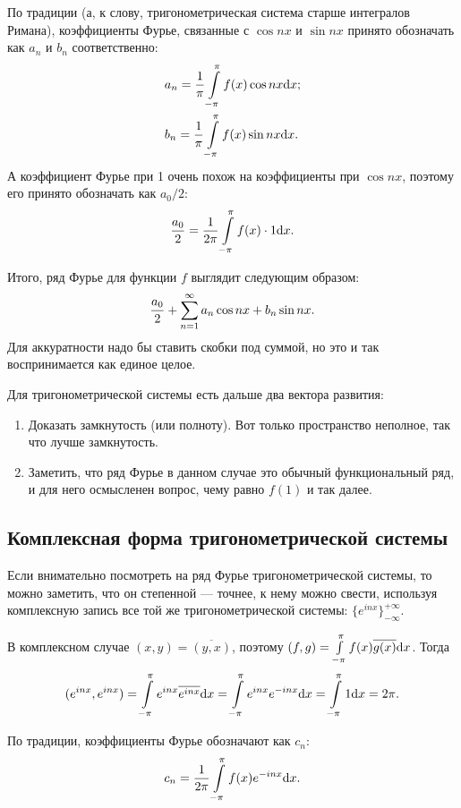 По традиции (а, к слову, тригонометрическая система старше интегралов Римана), коэффициенты Фурье, связанные с $\cos nx$ и $\sin nx$ принято обозначать как $a_n $ и $b_n$ соответственно:
\begin{align*}
&a_n = \frac{1}{\pi}  \int\limits_{-\pi}^{\pi} f(x) \cos nx \mathrm{d} x;\\
&b_n = \frac1\pi  \int\limits_{-\pi}^{\pi} f(x) \sin nx \mathrm{d} x.
\end{align*}
А коэффициент Фурье при 1 очень похож на коэффициенты при $\cos nx$, поэтому его принято обозначать как $a_0/2$:
$$
\frac{a_0}{2} = \frac{1}{2\pi} \int\limits_{-\pi}^{\pi} f(x) \cdot 1 \mathrm{d} x.
$$

Итого, ряд Фурье для функции $f$ выглядит следующим образом:
$$
\frac{a_0}{2} + \sum\limits_{n=1}^{\infty} a_n \cos nx + b_n \sin nx.
$$
Для аккуратности надо бы ставить скобки под суммой, но это и так воспринимается как единое целое.

Для тригонометрической системы есть дальше два вектора развития:
\begin{enumerate}
\item Доказать замкнутость (или полноту). Вот только пространство неполное, так что лучше замкнутость.
\item Заметить, что ряд Фурье в данном случае это обычный функциональный ряд, и для него осмысленен вопрос, чему равно $f(1)$ и так далее.
\end{enumerate}

\subsection{Комплексная форма тригонометрической системы}
Если внимательно посмотреть на ряд Фурье тригонометрической системы, то можно заметить, что он степенной --- точнее, к нему можно свести, используя комплексную запись все той же тригонометрической системы: $\{ e^{inx} \}_{-\infty}^{+\infty}$.

В комплексном случае $(x, y) = \overline{(y, x)}$, поэтому $(f, g) =  \int\limits_{-\pi}^{\pi} f(x)\overline{g(x)} \mathrm{d} x$. Тогда
\begin{gather*}
(e^{inx}, e^{inx}) =  \int\limits_{-\pi}^{\pi} e^{inx} \overline{e^{inx}} \mathrm{d} x=  \int\limits_{-\pi}^{\pi} e^{inx} e^{-inx} \mathrm{d} x =  \int\limits_{-\pi}^{\pi} 1 \mathrm{d} x = 2 \pi.
\end{gather*}

По традиции, коэффициенты Фурье обозначают как $c_n$:
$$
c_n = \frac{1}{2\pi}  \int\limits_{-\pi}^{\pi} f(x) e^{-inx} \mathrm{d} x.
$$

